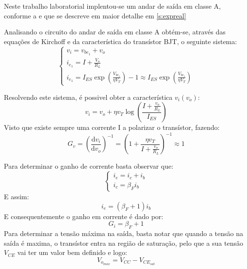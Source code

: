 \documentclass[%
  reprint,
  nofootinbib,
  amsmath,amssymb,
  aps,
  10pt,
  a4paper
]{revtex4-1}
\begin{document}

Neste trabalho laboratorial implentou-se um andar de saída em classe A, conforme a  e que se descreve em maior detalhe em \ref{s:expreal}

Analisando o circuito do andar de saída em classe A obtém-se, através das equações de Kirchoff e da característica do transístor BJT, o seguinte sistema:
\begin{equation}
\begin{cases} v_i=v_{{be}_1}+v_o \\ i_{e_1}=I+\frac{V_o}{R_L}\\i_{e_1}=I_{ES}\exp \left(\frac{V_{{be}_1}}{\eta V_T}\right)-1\approx I_{ES}\exp \left(\frac{V_{{be}_1}}{\eta V_T}\right)
 \end{cases} 
\end{equation}

Resolvendo este sistema, é possivel obter a característica $v_i(v_o)$:
\begin{equation}
v_i=v_o+\eta v_T\log \left(\frac{I+\frac{v_o}{R_L}}{I_{ES}}\right)
\end{equation}
Visto que existe sempre uma corrente I a polarizar o transístor, fazendo:
\begin{equation}
G_v=\left(\frac{\mathrm{d}v_i}{\mathrm{d}v_o}\right)^{-1}=\left(1+\frac{\eta v_T}{I+\frac{v_o}{R_L}}\right)^{-1}\approx 1
\label{eq:g_v}
\end{equation}

Para determinar o ganho de corrente basta observar que:
\begin{equation}
\begin{cases} i_e=i_c+i_b\\ i_c=\beta_F i_b
\end{cases}
\end{equation}
E assim:
\begin{equation}
i_e=(\beta_F+1)i_b
\end{equation}
E consequentemente o ganho em corrente é dado por:
\begin{equation}
G_i=\beta_F+1
\label{eq:g_i}
\end{equation}
Para determinar a tensão máxima na saída, basta notar que quando a tensão na saída é maxima, o transístor entra na região de saturação, pelo que a sua tensão $V_{CE}$ vai ter um valor bem definido e logo:
\begin{equation}
V_{o_{max}}=V_{CC}-V_{{CE}_{sat}}
\label{eq:sat}
\end{equation}
\end{document}
